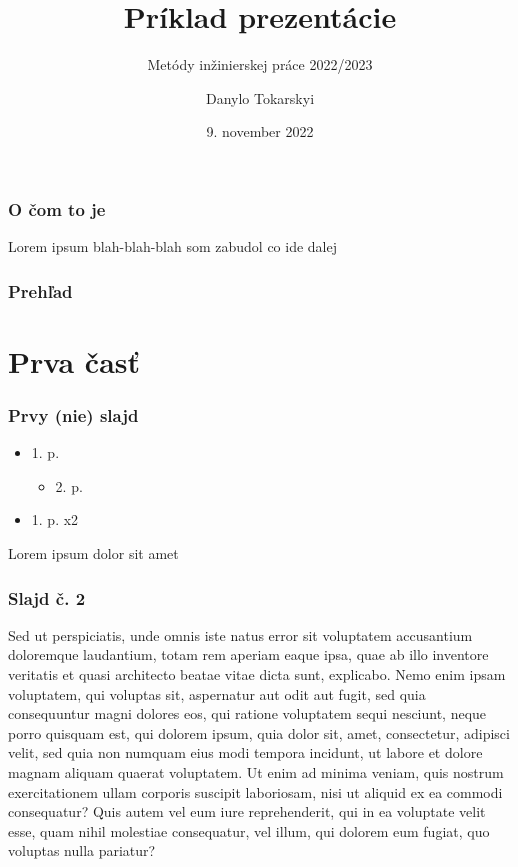 \documentclass{beamer}
\author{Danylo Tokarskyi}
\institute{
	Fakulta informatiky a informačných technológií\\
	Slovenská technická univerzita v Bratislave}
\subtitle{\vspace{3mm} Metódy inžinierskej práce 2022/2023}
\title{Príklad prezentácie
}
\date{\footnotesize 9. november 2022}
\newcommand{\ssection}[1]{
	\section{#1}
	\begin{frame}[fragile=singleslide]\frametitle{}
	\Huge #1
	\end{frame}
}
\begin{document}
\begin{frame}[fragile=singleslide]
	\titlepage
\end{frame}


\begin{frame}[fragile=singleslide]\frametitle{O čom to je}
	Lorem ipsum blah-blah-blah som zabudol co ide dalej
\end{frame}


\begin{frame}[fragile=singleslide]\frametitle{Prehľad}
	\tableofcontents
\end{frame}

\section{Prva časť}

\begin{frame}[fragile=singleslide]\frametitle{Prvy (nie) slajd}
	\begin{itemize}
		\item 1. p.
		      \begin{itemize}
			      \item 2. p.
		      \end{itemize}
		\item 1. p. x2
	\end{itemize}
	Lorem ipsum dolor sit amet
\end{frame}

\begin{frame}[fragile=singleslide]\frametitle{Slajd č. 2}
	Sed ut perspiciatis, unde omnis iste natus error sit voluptatem
	accusantium doloremque laudantium, totam rem aperiam eaque ipsa,
	quae ab illo inventore veritatis et quasi architecto beatae
	vitae dicta sunt, explicabo. Nemo enim ipsam voluptatem, qui
	voluptas sit, aspernatur aut odit aut fugit, sed quia
	consequuntur magni dolores eos, qui ratione voluptatem sequi
	nesciunt, neque porro quisquam est, qui dolorem ipsum, quia
	dolor sit, amet, consectetur, adipisci velit,
	sed quia non numquam eius modi tempora incidunt, ut labore et dolore
	magnam aliquam quaerat voluptatem. Ut enim ad minima veniam, quis
	nostrum exercitationem ullam corporis suscipit laboriosam, nisi ut
	aliquid ex ea commodi consequatur? Quis autem vel eum iure
	reprehenderit, qui in ea voluptate velit esse, quam nihil
	molestiae consequatur, vel illum,
	qui dolorem eum fugiat, quo voluptas nulla pariatur?
\end{frame}
\end{document}
